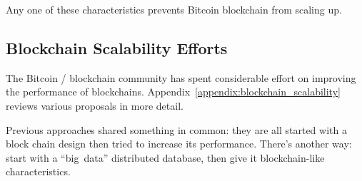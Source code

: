 Any one of these characteristics prevents Bitcoin blockchain from scaling up.

\subsection{Blockchain Scalability Efforts}
The Bitcoin / blockchain community has spent considerable effort on improving the performance of blockchains.
Appendix~\ref{appendix:blockchain_scalability} reviews various proposals in more detail.

Previous approaches shared something in common: they are all started with a block chain design then tried to increase its performance.
There’s another way: start with a ``big~data'' distributed database, then give it blockchain-like characteristics.